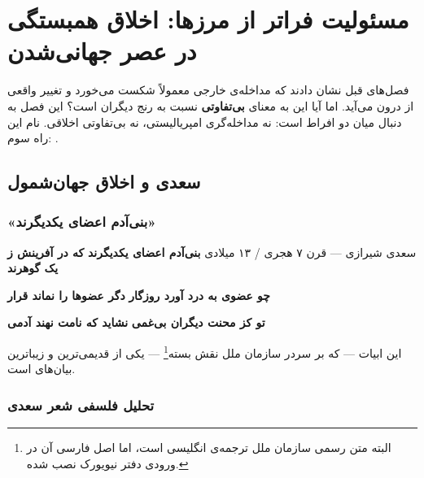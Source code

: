 \chapter{مسئولیت فراتر از مرزها: اخلاق همبستگی در عصر جهانی‌شدن}
\label{ch:responsibility-beyond-borders}

\begin{tcolorbox}[mybox, title={درباره‌ی این فصل}]
فصل‌های قبل نشان دادند که مداخله‌ی خارجی معمولاً شکست می‌خورد و تغییر
واقعی از درون می‌آید. اما آیا این به معنای \textbf{بی‌تفاوتی} نسبت به رنج
دیگران است؟ این فصل به دنبال  میان دو افراط است: نه
مداخله‌گری امپریالیستی، نه بی‌تفاوتی اخلاقی. نام این راه سوم:
.
\end{tcolorbox}


\section{سعدی و اخلاق جهان‌شمول}
\label{sec:ch17-saadi}

\subsection{«بنی‌آدم اعضای یکدیگرند»}

\begin{histQuote}{سعدی شیرازی — قرن ۷ هجری / ۱۳ میلادی}
\textbf{بنی‌آدم اعضای یکدیگرند} \quad
\textbf{که در آفرینش ز یک گوهرند}

\textbf{چو عضوی به درد آورد روزگار} \quad
\textbf{دگر عضوها را نماند قرار}

\textbf{تو کز محنت دیگران بی‌غمی} \quad
\textbf{نشاید که نامت نهند آدمی}

\vspace{0.5em}
این ابیات — که بر سردر سازمان ملل نقش بسته\footnote{البته متن رسمی
سازمان ملل ترجمه‌ی انگلیسی است، اما اصل فارسی آن در ورودی دفتر نیویورک
نصب شده.} — یکی از قدیمی‌ترین و زیباترین بیان‌های
 است.
\end{histQuote}


\subsection{تحلیل فلسفی شعر سعدی}


